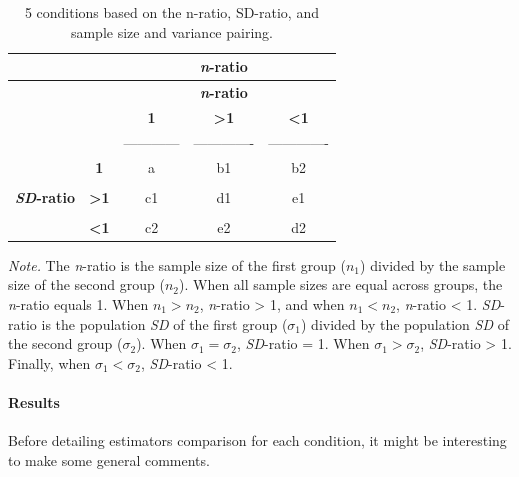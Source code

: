 \documentclass[
  man,floatsintext]{apa6}
\begin{document}
\begin{longtable}[]{@{}ccccc@{}}
\caption{5 conditions based on the n-ratio, SD-ratio, and sample size and variance pairing.}\tabularnewline
\toprule
& & & \textbf{\emph{n}-ratio} &\tabularnewline
\midrule
\endfirsthead
\toprule
& & & \textbf{\emph{n}-ratio} &\tabularnewline
\midrule
\endhead
& & \textbf{1} & \textbf{\textgreater1} & \textbf{\textless1}\tabularnewline
& & ------------ & ------------- & -------------\tabularnewline
& \textbf{1} & a & b1 & b2\tabularnewline
& & & &\tabularnewline
\textbf{\emph{SD}-ratio} & \textbf{\textgreater1} & c1 & d1 & e1\tabularnewline
& & & &\tabularnewline
& \textbf{\textless1} & c2 & e2 & d2\tabularnewline
\bottomrule
\end{longtable}

\emph{Note.} The \emph{n}-ratio is the sample size of the first group (\(n_1\)) divided by the sample size of the second group (\(n_2\)). When all sample sizes are equal across groups, the \emph{n}-ratio equals 1. When \(n_1 > n_2\), \emph{n}-ratio \textgreater{} 1, and when \(n_1 < n_2\), \emph{n}-ratio \textless{} 1. \emph{SD}-ratio is the population \emph{SD} of the first group (\(\sigma_1\)) divided by the population \emph{SD} of the second group (\(\sigma_2\)). When \(\sigma_1=\sigma_2\), \emph{SD}-ratio = 1. When \(\sigma_1>\sigma_2\), \emph{SD}-ratio \textgreater{} 1. Finally, when \(\sigma_1<\sigma_2\), \emph{SD}-ratio \textless{} 1.

\hypertarget{results}{%
\paragraph{Results}\label{results}}

Before detailing estimators comparison for each condition, it might be interesting to make some general comments.
\end{document}
